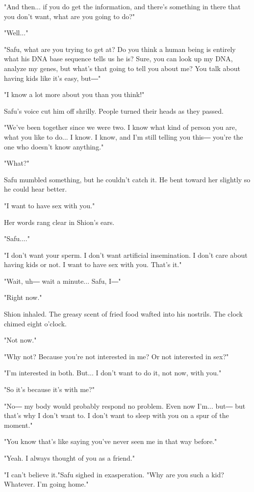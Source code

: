 "And then... if you do get the information, and there's something in
there that you don't want, what are you going to do?"

"Well..."

"Safu, what are you trying to get at? Do you think a human being is
entirely what his DNA base sequence tells us he is? Sure, you can look
up my DNA, analyze my genes, but what's that going to tell you about me?
You talk about having kids like it's easy, but―"

"I know a lot more about you than you think!"

Safu's voice cut him off shrilly. People turned their heads as they
passed.

"We've been together since we were two. I know what kind of person you
are, what you like to do... I know. I know, and I'm still telling you
this― you're the one who doesn't know anything."

"What?"

Safu mumbled something, but he couldn't catch it. He bent toward her
slightly so he could hear better.

"I want to have sex with you."

Her words rang clear in Shion's ears.~

"Safu...."

"I don't want your sperm. I don't want artificial insemination. I don't
care about having kids or not. I want to have sex with you. That's it."

"Wait, uh― wait a minute... Safu, I―"

"Right now."

Shion inhaled. The greasy scent of fried food wafted into his nostrils.
The clock chimed eight o'clock.

"Not now."

"Why not? Because you're not interested in me? Or not interested in
sex?"

"I'm interested in both. But... I don't want to do it, not now, with
you."

"So it's because it's with me?"

"No― my body would probably respond no problem. Even now I'm... but― but
that's why I don't want to. I don't want to sleep with you on a spur of
the moment."

"You know that's like saying you've never seen me in that way before."

"Yeah. I always thought of you as a friend."

"I can't believe it."Safu sighed in exasperation. "Why are you such a
kid? Whatever. I'm going home."


